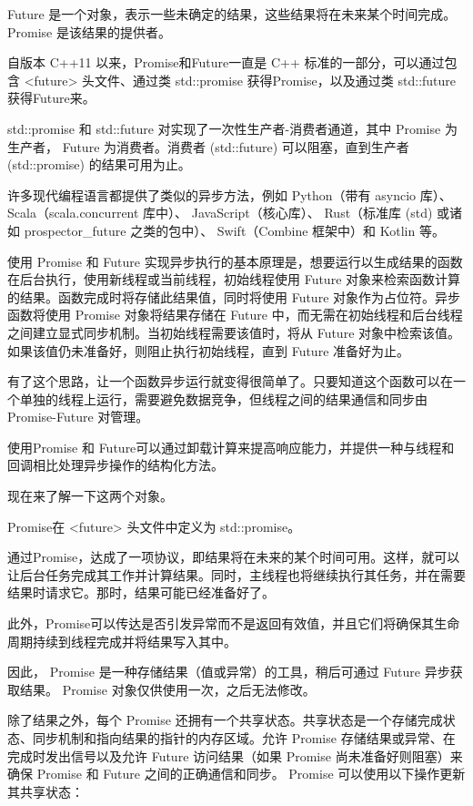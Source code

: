
Future 是一个对象，表示一些未确定的结果，这些结果将在未来某个时间完成。 Promise 是该结果的提供者。

自版本 C++11 以来，Promise和Future一直是 C++ 标准的一部分，可以通过包含 <future> 头文件、通过类 std::promise 获得Promise，以及通过类 std::future 获得Future来。

std::promise 和 std::future 对实现了一次性生产者-消费者通道，其中 Promise 为生产者， Future 为消费者。消费者 (std::future) 可以阻塞，直到生产者 (std::promise) 的结果可用为止。


许多现代编程语言都提供了类似的异步方法，例如 Python（带有 asyncio 库）、 Scala（scala.concurrent 库中）、 JavaScript（核心库）、 Rust（标准库 (std) 或诸如 prospector\_future 之类的包中）、 Swift（Combine 框架中）和 Kotlin 等。

使用 Promise 和 Future 实现异步执行的基本原理是，想要运行以生成结果的函数在后台执行，使用新线程或当前线程，初始线程使用 Future 对象来检索函数计算的结果。函数完成时将存储此结果值，同时将使用 Future 对象作为占位符。异步函数将使用 Promise 对象将结果存储在 Future 中，而无需在初始线程和后台线程之间建立显式同步机制。当初始线程需要该值时，将从 Future 对象中检索该值。如果该值仍未准备好，则阻止执行初始线程，直到 Future 准备好为止。

有了这个思路，让一个函数异步运行就变得很简单了。只要知道这个函数可以在一个单独的线程上运行，需要避免数据竞争，但线程之间的结果通信和同步由 Promise-Future 对管理。

使用Promise 和 Future可以通过卸载计算来提高响应能力，并提供一种与线程和回调相比处理异步操作的结构化方法。

现在来了解一下这两个对象。


Promise在 <future> 头文件中定义为 std::promise。

通过Promise，达成了一项协议，即结果将在未来的某个时间可用。这样，就可以让后台任务完成其工作并计算结果。同时，主线程也将继续执行其任务，并在需要结果时请求它。那时，结果可能已经准备好了。

此外，Promise可以传达是否引发异常而不是返回有效值，并且它们将确保其生命周期持续到线程完成并将结果写入其中。

因此， Promise 是一种存储结果（值或异常）的工具，稍后可通过 Future 异步获取结果。 Promise 对象仅供使用一次，之后无法修改。

除了结果之外，每个 Promise 还拥有一个共享状态。共享状态是一个存储完成状态、同步机制和指向结果的指针的内存区域。允许 Promise 存储结果或异常、在完成时发出信号以及允许 Future 访问结果（如果 Promise 尚未准备好则阻塞）来确保 Promise 和 Future 之间的正确通信和同步。 Promise 可以使用以下操作更新其共享状态：

